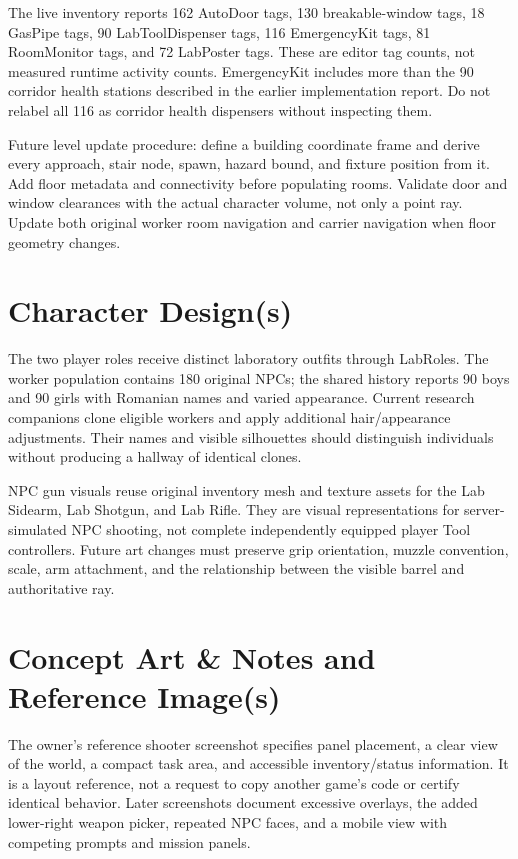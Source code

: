 The live inventory reports 162 AutoDoor tags, 130 breakable-window tags, 18 GasPipe tags, 90 LabToolDispenser tags, 116 EmergencyKit tags, 81 RoomMonitor tags, and 72 LabPoster tags.\allowbreak{} These are editor tag counts, not measured runtime activity counts.\allowbreak{} EmergencyKit includes more than the 90 corridor health stations described in the earlier implementation report.\allowbreak{} Do not relabel all 116 as corridor health dispensers without inspecting them.\allowbreak{}

Future level update procedure: define a building coordinate frame and derive every approach, stair node, spawn, hazard bound, and fixture position from it.\allowbreak{} Add floor metadata and connectivity before populating rooms.\allowbreak{} Validate door and window clearances with the actual character volume, not only a point ray.\allowbreak{} Update both original worker room navigation and carrier navigation when floor geometry changes.\allowbreak{}

\section{Character Design(s)}
The two player roles receive distinct laboratory outfits through LabRoles.\allowbreak{} The worker population contains 180 original NPCs; the shared history reports 90 boys and 90 girls with Romanian names and varied appearance.\allowbreak{} Current research companions clone eligible workers and apply additional hair/\allowbreak{}appearance adjustments.\allowbreak{} Their names and visible silhouettes should distinguish individuals without producing a hallway of identical clones.\allowbreak{}

NPC gun visuals reuse original inventory mesh and texture assets for the Lab Sidearm, Lab Shotgun, and Lab Rifle.\allowbreak{} They are visual representations for server-simulated NPC shooting, not complete independently equipped player Tool controllers.\allowbreak{} Future art changes must preserve grip orientation, muzzle convention, scale, arm attachment, and the relationship between the visible barrel and authoritative ray.\allowbreak{}

\section{Concept Art \& Notes and Reference Image(s)}
The owner's reference shooter screenshot specifies panel placement, a clear view of the world, a compact task area, and accessible inventory/\allowbreak{}status information.\allowbreak{} It is a layout reference, not a request to copy another game's code or certify identical behavior.\allowbreak{} Later screenshots document excessive overlays, the added lower-right weapon picker, repeated NPC faces, and a mobile view with competing prompts and mission panels.\allowbreak{}

